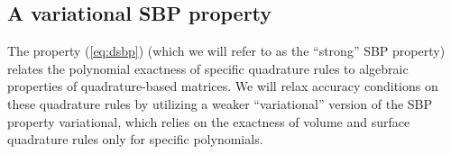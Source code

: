 \documentclass[review]{siamart0216}
\theoremstyle{assumption}
\begin{document}
%


\subsection{A variational SBP property}


The property (\ref{eq:dsbp}) (which we will refer to as the ``strong'' SBP property) relates the polynomial exactness of specific quadrature rules to algebraic properties of quadrature-based matrices.  We will relax accuracy conditions on these quadrature rules by utilizing a weaker ``variational'' version of the SBP property variational, which relies on the exactness of volume and surface quadrature rules only for specific polynomials.  
\end{document}
